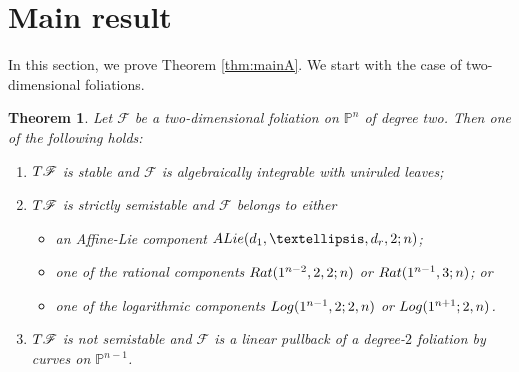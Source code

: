 \documentclass[twoside]{amsart}
\numberwithin{equation}{section}
\newcommand{\p}[1]{{\mathbb{P}^{#1}}}
\newcommand{\pn}{{\mathbb{P}^{n}}}
\newcommand{\sF}{\mathscr{F}}
\newcommand{\tF}{{\rm T}\sF}
\newcommand{\rat}[2]{{\rm Rat}(#1;#2)}
\newcommand{\logg}[3]{{\rm Log}(#1;#2,#3)}
\newcommand{\exc}[3]{{\rm ALie}(#1,#2;#3)}
\newtheorem{theorem}{Theorem}[section]
\theoremstyle{definition}
\begin{document}
\section{Main result}\label{sec:main}
In this section, we prove Theorem \ref{thm:mainA}. We start with the case of two-dimensional foliations. 

\begin{theorem}\label{thm:dim2-structure}
Let $\sF$ be a two-dimensional foliation on $\pn$ of degree two. Then one of the following holds:
\begin{enumerate}
    \item $\tF$ is stable and $\sF$ is algebraically integrable with uniruled leaves;
    \item $\tF$ is strictly semistable and $\sF$ belongs to either 
        \begin{itemize}
            \item an Affine-Lie component $\exc{d_1, \dots, d_r}{2}{n}$;
            \item one of the rational components $\rat{1^{n-2},2,2}{n}$ or $\rat{1^{n-1},3}{n}$; or
            \item one of the logarithmic components $\logg{1^{n-1},2}{2}{n}$ or $\logg{1^{n+1}}{2}{n}$.
        \end{itemize}
    \item $\tF$ is not semistable and $\sF$ is a linear pullback of a degree-$2$ foliation by curves on $\p{n-1}$.
\end{enumerate}
\end{theorem}
 
\end{document}

